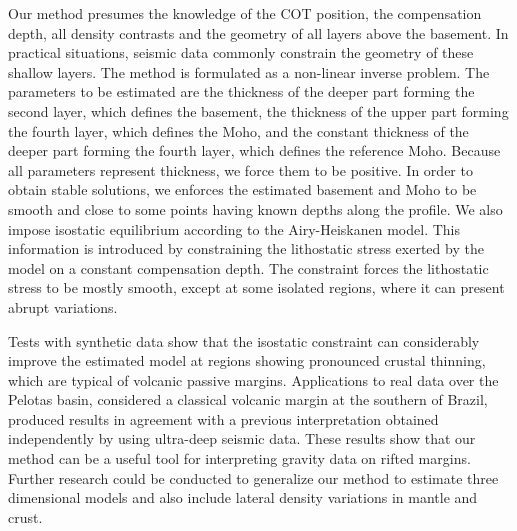 \documentclass[manuscript]{geophysics}
\begin{document}
Our method presumes the knowledge of the COT position, the compensation depth,
all density contrasts and the geometry of all layers above the basement.
In practical situations, 
seismic data commonly constrain the geometry of these shallow layers.
The method is formulated as a non-linear inverse problem. 
The parameters to be estimated are the thickness of the deeper part forming the 
second layer, which defines the basement, the thickness of the upper part forming the 
fourth layer, which defines the Moho, and the constant thickness of the deeper part forming 
the fourth layer, which defines the reference Moho.
Because all parameters represent thickness, we force them to be positive.
In order to obtain stable solutions, we enforces the estimated basement and Moho to be 
smooth and close to some points having known depths along the profile.
We also impose isostatic equilibrium according to the Airy-Heiskanen model.
This information is introduced by constraining the lithostatic stress
exerted by the model on a constant compensation depth. The constraint forces the
lithostatic stress to be mostly smooth, except at some isolated regions, where it can
present abrupt variations.

Tests with synthetic data show that the isostatic constraint can considerably improve 
the estimated model at regions showing pronounced crustal thinning, which 
are typical of volcanic passive margins. 
Applications to real data over the Pelotas basin, considered a classical volcanic
margin at the southern of Brazil, produced results in agreement with a previous 
interpretation obtained independently by using ultra-deep seismic data.
These results show that our method can be a useful tool for interpreting
gravity data on rifted margins.
Further research could be conducted to generalize our method to estimate
three dimensional models and also include lateral density variations in 
mantle and crust.

\end{document}
